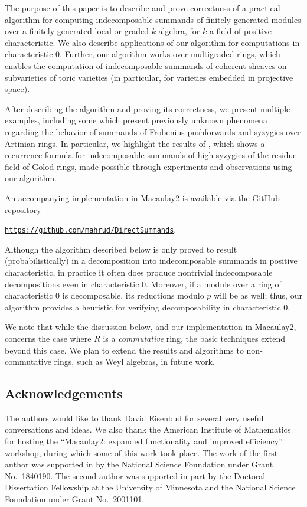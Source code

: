 \documentclass[12pt]{article}
\numberwithin{equation}{section}
\theoremstyle{theorem}
\numberwithin{thm}{section}
\theoremstyle{definition}
\begin{document}
The purpose of this paper is to describe and prove correctness of a practical algorithm for computing indecomposable summands of finitely generated modules over a finitely generated local or graded $k$-algebra, for $k$ a field of positive characteristic. We also describe applications of our algorithm for computations in characteristic 0. Further, our algorithm works over multigraded rings, which enables the computation of indecomposable summands of coherent sheaves on subvarieties of toric varieties (in particular, for varieties embedded in projective space).

After describing the algorithm and proving its correctness, we present multiple examples, including some which present previously unknown phenomena regarding the behavior of summands of Frobenius pushforwards and syzygies over Artinian rings. In particular, we highlight the results of \cite{CDE24}, which shows a recurrence formula for indecomposable summands of high syzygies of the residue field of Golod rings, made possible through experiments and observations using our algorithm.

An accompanying implementation in Macaulay2 \cite{M2} is available via the GitHub repository \\
\centerline{
  \href{https://github.com/mahrud/DirectSummands}
  {\texttt{https://github.com/mahrud/DirectSummands}}.}


\begin{rem}
Although the algorithm described below is only proved to result (probabilistically) in a decomposition into indecomposable summands in positive characteristic, in practice it often does produce nontrivial indecomposable decompositions even in characteristic 0. Moreover, if a module over a ring of characteristic 0 is decomposable, its reductions modulo $p$ will be as well; thus, our algorithm provides a heuristic for verifying decomposability in characteristic 0.

  We note that while the discussion below, and our implementation in Macaulay2, concerns the case where $R$ is a \emph{commutative} ring, the basic techniques extend beyond this case. We plan to extend the results and algorithms to non-commutative rings, such as Weyl algebras, in future work.
\end{rem}



\subsection*{Acknowledgements}
The authors would like to thank David Eisenbud for several very useful conversations and ideas.
We also thank the American Institute of Mathematics for hosting the ``Macaulay2: expanded functionality and improved efficiency'' workshop, during which some of this work took place.
The work of the first author was supported in by the National Science Foundation under Grant No.~1840190.
The second author was supported in part by the Doctoral Dissertation Fellowship at the University of Minnesota and the National Science Foundation under Grant No.~2001101.
\end{document}

